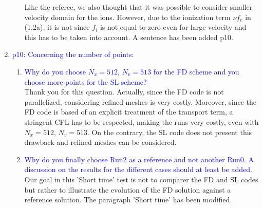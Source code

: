 \documentclass{article}
\begin{document}
\begin{enumerate}
\begin{enumerate}
Like the referee, we also thought that it was possible to consider smaller velocity domain for the ions. However, due to the 
ionization term $\nu f_e$ in (1.2a), it is not since $f_i$ is not equal to zero even for large velocity and this has to be taken into account. 
A sentence has been added p10. \\
\end{enumerate}
    \item \textcolor{blue}{p10: Concerning the number of points:}
    \begin{enumerate}
    \item \textcolor{blue}{Why do you choose $N_x=512$, $N_v=513$ for the FD scheme and you choose more points
for the SL scheme?}\\ 
Thank you for this question. Actually, since the FD code is not parallelized, considering refined meshes is very costly. 
Moreover, since the FD code is based of an explicit treatment of the transport term, a stringent CFL has to be respected, making the 
runs very costly, even with $N_x=512$, $N_v=513$. On the contrary, the SL code does not present this drawback and 
refined meshes can be considered. \\
\item \textcolor{blue}{Why do you finally choose Run2 as a reference and not another Run0. A discussion
on the results for the different cases should at least be added.}\\ 
Our goal in this 'Short time' test is not to comparer the FD and SL codes but  rather to illustrate the evolution of the FD solution 
against a reference solution.  The paragraph 'Short time' has been modified. 

\end{enumerate}
\end{enumerate}
\end{document}
